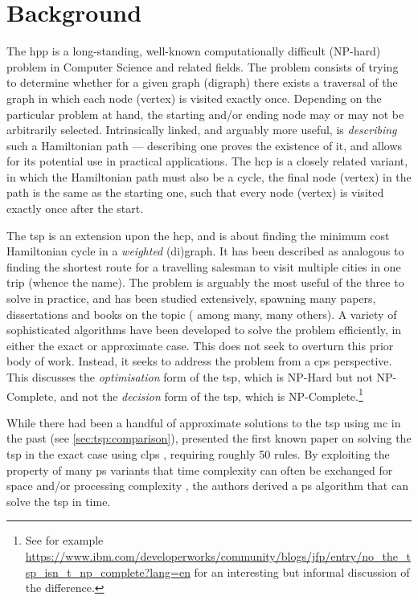\section{Background}

The \gls{hpp} is a long-standing, well-known computationally difficult (NP-hard) problem in Computer Science and related fields.  The problem consists of trying to determine whether for a given graph (digraph) there exists a traversal of the graph in which each node (vertex) is visited exactly once.  Depending on the particular problem at hand, the starting and/or ending node may or may not be arbitrarily selected.  Intrinsically linked, and arguably more useful, is \emph{describing} such a Hamiltonian path --- describing one proves the existence of it, and allows for its potential use in practical applications.  The \gls{hcp} is a closely related variant, in which the Hamiltonian path must also be a cycle, \ie{} the final node (vertex) in the path is the same as the starting one, such that every node (vertex) is visited exactly once after the start.

The \gls{tsp} is an extension upon the \gls{hcp}, and is about finding the minimum cost Hamiltonian cycle in a \emph{weighted} (di)graph.  It has been described as analogous to finding the shortest route for a travelling salesman to visit multiple cities in one trip (whence the name).  The problem is arguably the most useful of the three to solve in practice, and has been studied extensively, spawning many papers, dissertations and books on the topic (\eg{} \cite{Smith2017,Ezugwu2017,Cook2012,Applegate2006} among many, many others).  A variety of sophisticated algorithms have been developed to solve the problem efficiently, in either the exact or approximate case.  This  does not seek to overturn this prior body of work.  Instead, it seeks to address the problem from a \gls{cps} perspective.  This  discusses the \emph{optimisation} form of the \gls{tsp}, which is NP-Hard but not NP-Complete, and not the \emph{decision} form of the \gls{tsp}, which is NP-Complete.\footnote{See for example \url{https://www.ibm.com/developerworks/community/blogs/jfp/entry/no_the_tsp_isn_t_np_complete?lang=en} for an interesting but informal discussion of the difference.}

While there had been a handful of approximate solutions to the \gls{tsp} using \gls{mc} in the past (see \vref{sec:tsp:comparison}), \citeauthor{Guo2017} presented the first known paper on solving the \gls{tsp} in the exact case using \gls{clps} \cite{Guo2017}, requiring roughly 50 rules.  By exploiting the property of many \gls{ps} variants that time complexity can often be exchanged for space and/or processing complexity \cite{Paun1999,Paun2002a,Jimenez2003,Song2017}, the authors derived a \gls{ps} algorithm that can solve the \gls{tsp} in  time.

